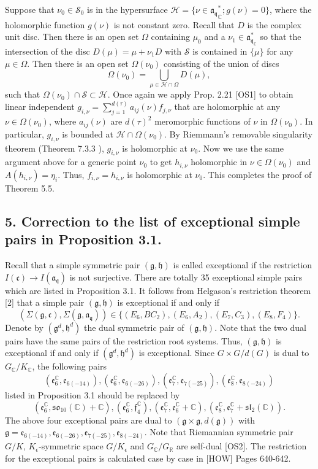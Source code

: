 \documentclass[a4paper]{amsart}
\theoremstyle{plain}
\theoremstyle{definition}
\newcommand{\fra}{\mathfrak{a}}
\newcommand{\frc}{\mathfrak{c}}
\newcommand{\fre}{\mathfrak{e}}
\newcommand{\frf}{\mathfrak{f}}
\newcommand{\frg}{\mathfrak{g}}
\newcommand{\frh}{\mathfrak{h}}
\newcommand{\frl}{\mathfrak{l}}
\newcommand{\fro}{\mathfrak{o}}
\newcommand{\frq}{\mathfrak{q}}
\newcommand{\frs}{\mathfrak{s}}
\newcommand{\bbC}{\mathbb{C}}
\newcommand{\bbR}{\mathbb{R}}
\newcommand{\caH}{\mathcal{H}}
\newcommand{\caS}{\mathcal{S}}
\begin{document}
Suppose that $\nu_0\in \caS_0$ is in the hypersurface  $\caH=\{ \nu\in {\fra_\frq}^*_\bbC; g(\nu)=0\}$, where
the holomorphic function $g(\nu)$ is not constant zero. Recall that $D$  is the complex unit disc.
Then there is an open set $\Omega$ containing $\mu_0$ and a $\nu_1 \in \fra^*_{\frq_\bbC}$
so that the intersection of the disc $D(\mu)=\mu+\nu_1D$ with $\caS$ is contained in $\{\mu\}$ for any $\mu\in \Omega$.
Then there is an open set $\Omega(\nu_0)$ consisting of the union of discs
 $$\Omega(\nu_0)=\bigcup_{ \mu\in \caH\cap \Omega} D(\mu),$$
such that  $\Omega(\nu_0)\cap \caS\subset \caH$. Once again we  apply Prop. 2.21 [OS1] to obtain linear independent $g_{i,\nu}=\sum_{j=1}^{d(\tau)} a_{ij}(\nu)f_{j,\nu}$
that are holomorphic at any  $\nu\in \Omega(\nu_0)$,
where $a_{ij}(\nu)$ are $d(\tau)^2$ meromorphic functions of $\nu$ in $\Omega(\nu_0)$.  In particular, $g_{i,\nu}$ is
bounded at $\caH\cap \Omega(\nu_0)$.
By Riemmann's removable singularity theorem (Theorem 7.3.3 \cite{K}), $g_{i,\nu}$
is holomorphic at $\nu_0$.  Now we use  the same argument above for a generic point $\nu_0$ to get
$h_{i,\nu}$ holomorphic in $\nu\in \Omega(\nu_0)$ and $A({h_{i,\nu}})=\eta_i$.
Thus, $f_{i,\nu}=h_{i,\nu}$ is holomorphic at $\nu_0$.  This completes the proof of Theorem 5.5.


\subsection*{5. Correction to the list of exceptional simple pairs in Proposition 3.1.}
Recall that a simple symmetric pair $(\frg,\frh)$ is
called exceptional if the restriction $I(\frc)\rightarrow I(\fra_\frq)$ is not surjective.
There are totally 35 exceptional simple pairs which are listed in Proposition 3.1.
It follows from Helgason's restriction theorem [2] that a simple  pair  $(\frg,\frh)$ is exceptional if and only if
$$(\Sigma(\frg,\frc),\Sigma(\frg,\fra_\frq)) \in
\{(E_6,BC_2),(E_6,A_2),(E_7,C_3),(E_8,F_4)\}.$$
Denote by $(\frg^d,\frh^d)$ the dual symmetric pair of $(\frg,\frh)$.  Note that the two dual pairs have the
same pairs of the restriction root systems.
Thus, $(\frg,\frh)$ is exceptional if and only if $(\frg^d,\frh^d)$ is exceptional.   Since $G\times G/d(G)$ is dual to $G_\bbC/K_\bbC$, the following pairs
$$(\fre^\bbC_6,\fre_{6(-14)}), (\fre^\bbC_6,\fre_{6(-26)}), (\fre^\bbC_7,\fre_{7(-25)}), (\fre^\bbC_8,\fre_{8(-24)})$$
listed in Proposition 3.1 should be replaced by
$$(\fre^\bbC_6, \frs\fro_{10}(\bbC)+\bbC), (\fre^\bbC_6,\frf^\bbC_4), (\fre^\bbC_7,\fre^\bbC_6+\bbC), (\fre^\bbC_8,\fre^\bbC_7+\frs\frl_2(\bbC)).$$
The above four exceptional pairs are dual to $(\frg\times \frg,d(\frg))$
with $\frg=\fre_{6(-14)},\fre_{6(-26)},\fre_{7(-25)},\fre_{8(-24)}$.
Note that Riemannian symmetric pair $G/K$, $K_\epsilon$-symmetric space
$G/K_\epsilon$ and $G_\bbC/G_\bbR$ are self-dual [OS2].  The restriction for the 
exceptional pairs is calculated case by case in [HOW] Pages 640-642. 
\end{document}
